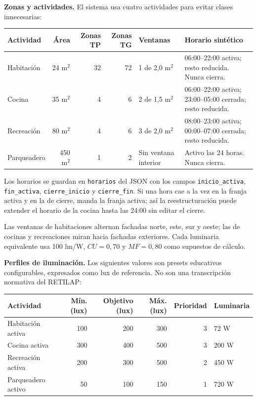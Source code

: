 \documentclass[12pt,a4paper]{article}
\newcommand{\codigo}[1]{\texttt{#1}}
\begin{document}
\textbf{Zonas y actividades.} El sistema usa cuatro actividades para evitar clases innecesarias:

\begin{center}\small
\begin{tabular}{p{}r r r p{}p{}}
\toprule
\textbf{Actividad} & \textbf{Área} & \textbf{Zonas TP} & \textbf{Zonas TG} & \textbf{Ventanas} & \textbf{Horario sintético}\\
\midrule
Habitación & 24 m$^2$ & 32 & 72 & 1 de 2,0 m$^2$ & 06:00--22:00 activa; resto reducida. Nunca cierra.\\
Cocina & 35 m$^2$ & 4 & 6 & 2 de 1,5 m$^2$ & 06:00--22:00 activa; 23:00--05:00 cerrada; resto reducida.\\
Recreación & 80 m$^2$ & 4 & 6 & 3 de 2,0 m$^2$ & 08:00--23:00 activa; 00:00--07:00 cerrada; resto reducida.\\
Parqueadero & 450 m$^2$ & 1 & 2 & Sin ventana interior & Activo las 24 horas. Nunca cierra.\\
\bottomrule
\end{tabular}
\end{center}

Los horarios se guardan en \codigo{horarios} del JSON con los campos \codigo{inicio\_activa}, \codigo{fin\_activa}, \codigo{cierre\_inicio} y \codigo{cierre\_fin}. Si una hora cae a la vez en la franja activa y en la de cierre, manda la franja activa; así la reestructuración puede extender el horario de la cocina hasta las 24:00 sin editar el cierre.

Las ventanas de habitaciones alternan fachadas norte, este, sur y oeste; las de cocinas y recreaciones miran hacia fachadas exteriores. Cada luminaria equivalente usa 100 lm/W, $CU=0,70$ y $MF=0,80$ como supuestos de cálculo.

\textbf{Perfiles de iluminación.} Los siguientes valores son presets educativos configurables, expresados como lux de referencia. No son una transcripción normativa del RETILAP:

\begin{center}\small
\begin{tabular}{p{}r r r r p{}}
\toprule
\textbf{Actividad} & \textbf{Mín. (lux)} & \textbf{Objetivo (lux)} & \textbf{Máx. (lux)} & \textbf{Prioridad} & \textbf{Luminaria}\\
\midrule
Habitación activa & 100 & 200 & 300 & 3 & 72 W\\
Cocina activa & 300 & 400 & 500 & 3 & 200 W\\
Recreación activa & 200 & 300 & 500 & 2 & 450 W\\
Parqueadero activo & 50 & 100 & 150 & 1 & 720 W\\
\bottomrule
\end{tabular}
\end{center}
\end{document}
